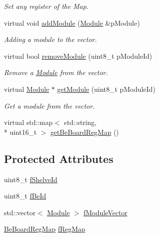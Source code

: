 \begin{DoxyCompactItemize}
\begin{DoxyCompactList}\small\item\em Set any register of the Map. \end{DoxyCompactList}\item 
virtual void \hyperlink{class_ph2___hw_description_1_1_be_board_a5242925c065165be9b407dabf889ac9a}{add\-Module} (\hyperlink{class_ph2___hw_description_1_1_module}{Module} \&p\-Module)
\begin{DoxyCompactList}\small\item\em Adding a module to the vector. \end{DoxyCompactList}\item 
virtual bool \hyperlink{class_ph2___hw_description_1_1_be_board_aba02e7319c8c41b569c583bfa2068215}{remove\-Module} (uint8\-\_\-t p\-Module\-Id)
\begin{DoxyCompactList}\small\item\em Remove a \hyperlink{class_ph2___hw_description_1_1_module}{Module} from the vector. \end{DoxyCompactList}\item 
virtual \hyperlink{class_ph2___hw_description_1_1_module}{Module} $\ast$ \hyperlink{class_ph2___hw_description_1_1_be_board_a71b8e3e970d554d7642bea8a9d21b037}{get\-Module} (uint8\-\_\-t p\-Module\-Id)
\begin{DoxyCompactList}\small\item\em Get a module from the vector. \end{DoxyCompactList}\item 
virtual std\-::map$<$ std\-::string, \\*
uint16\-\_\-t $>$ \hyperlink{class_ph2___hw_description_1_1_be_board_a8d27a8030371768636694f5b2ac95046}{get\-Be\-Board\-Reg\-Map} ()
\end{DoxyCompactItemize}
\subsection*{Protected Attributes}
\begin{DoxyCompactItemize}
\item 
uint8\-\_\-t \hyperlink{class_ph2___hw_description_1_1_be_board_a8e45d863c0a596466a78fd3e16ef92d1}{f\-Shelve\-Id}
\item 
uint8\-\_\-t \hyperlink{class_ph2___hw_description_1_1_be_board_aabe1a515a23ff8813d4641293a8b4ba1}{f\-Be\-Id}
\item 
std\-::vector$<$ \hyperlink{class_ph2___hw_description_1_1_module}{Module} $>$ \hyperlink{class_ph2___hw_description_1_1_be_board_adcee78870a20c92fc8c060ff709a4baf}{f\-Module\-Vector}
\item 
\hyperlink{namespace_ph2___hw_description_a2e13fb82c8ed98154c60f9d0f8467d72}{Be\-Board\-Reg\-Map} \hyperlink{class_ph2___hw_description_1_1_be_board_a6db4850485715c0f23c97c3d621a781b}{f\-Reg\-Map}
\end{DoxyCompactItemize}
